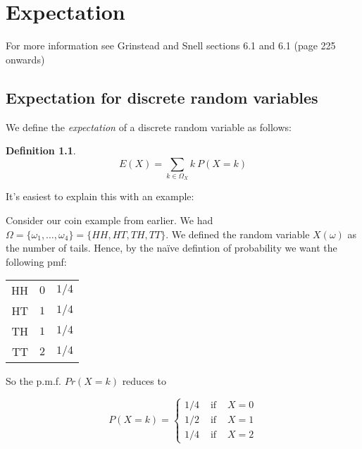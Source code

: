\documentclass[12pt]{extbook}
\newtheorem{df}{Definition}[section]
\begin{document}



\chapter{Expectation}


For more information see Grinstead and Snell sections 6.1 and 6.1 (page 225 onwards)

\section{Expectation for discrete random variables}

We define the \emph{expectation} of a discrete random variable as
follows:

\begin{df}
\begin{displaymath}
E(X) = \sum_{k \in \Omega_X} k\ P(X=k)
\end{displaymath}
\end{df}

It's easiest to explain this with an example:


Consider our coin example from earlier.   We had $\Omega = \{\omega_1, \ldots, \omega_4 \} = \{HH, HT, TH, TT\}$.   We defined the random variable $X(\omega)$ as the number of tails.   Hence, by the na\"ive defintion of probability we want the following pmf:

\begin{tabular}{rrr}
HH & $0$ & $1/4$ \\
HT & $1$ & $1/4$ \\
TH & $1$ & $1/4$ \\
TT & $2$ & $1/4$ 
\end{tabular}

So the p.m.f. $Pr(X=k)$ reduces to 

\begin{displaymath}
P(X=k) = \left\{ \begin{array}{rrr} 1/4 & \mbox{ if } & X=0 \\
1/2 & \mbox{ if } & X=1 \\ 1/4 & \mbox{ if } & X = 2 \end{array} \right.
\end{displaymath}
\end{document}
